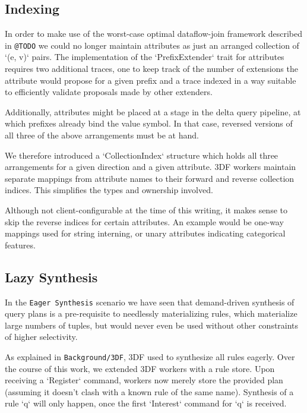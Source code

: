 \documentclass[../index.tex]{subfiles}
\begin{document}
\subsection{Indexing}

In order to make use of the worst-case optimal dataflow-join framework
described in \texttt{@TODO} we could no longer maintain attributes as just
an arranged collection of `(e, v)` pairs. The implementation of the
`PrefixExtender` trait for attributes requires two additional traces,
one to keep track of the number of extensions the attribute would
propose for a given prefix and a trace indexed in a way suitable to
efficiently validate proposals made by other extenders.

Additionally, attributes might be placed at a stage in the delta query
pipeline, at which prefixes already bind the value symbol. In that
case, reversed versions of all three of the above arrangements must be
at hand.

We therefore introduced a `CollectionIndex` structure which holds all
three arrangements for a given direction and a given attribute. 3DF
workers maintain separate mappings from attribute names to their
forward and reverse collection indices. This simplifies the types and
ownership involved.

Although not client-configurable at the time of this writing, it makes
sense to skip the reverse indices for certain attributes. An example
would be one-way mappings used for string interning, or unary
attributes indicating categorical features.

\subsection{Lazy Synthesis} \label{lazy-synthesis}

In the \texttt{Eager Synthesis} scenario we have seen that demand-driven
synthesis of query plans is a pre-requisite to needlessly
materializing rules, which materialize large numbers of tuples, but
would never even be used without other constraints of higher
selectivity.

As explained in \texttt{Background/3DF}, 3DF used to synthesize all rules
eagerly. Over the course of this work, we extended 3DF workers with a
rule store. Upon receiving a `Register` command, workers now merely
store the provided plan (assuming it doesn't clash with a known rule
of the same name). Synthesis of a rule `q` will only happen, once the
first `Interest` command for `q` is received.
\end{document}
